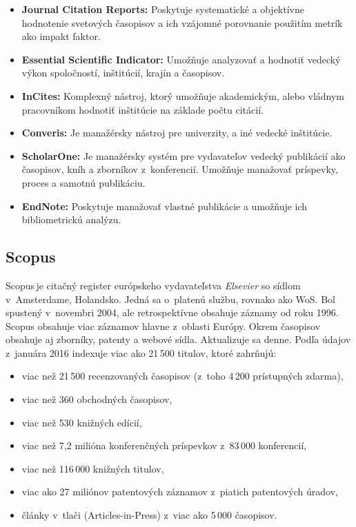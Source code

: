 \begin{itemize}
\item \textbf{Journal Citation Reports:} Poskytuje systematické a objektívne
  hodnotenie svetových časopisov a ich vzájomné porovnanie použitím metrík ako
  impakt faktor.
\item \textbf{Essential Scientific Indicator:} Umožňuje analyzovať a hodnotiť
  vedecký výkon spoločností, inštitúcií, krajín a časopisov.
\item \textbf{InCites:} Komplexný nástroj, ktorý umožňuje akademickým,
  alebo vládnym pracovníkom hodnotiť inštitúcie na základe počtu citácií.
\item \textbf{Converis:} Je manažérsky nástroj pre univerzity, a iné vedecké
  inštitúcie.
\item \textbf{ScholarOne:} Je manažérsky systém pre vydavateľov vedecký
  publikácií ako časopisov, kníh a zborníkov z~konferencií. Umožňuje
  manažovať príspevky,  proces a samotnú publikáciu.
\item \textbf{EndNote:} Poskytuje manažovať vlastné publikácie a umožňuje
  ich bibliometrickú analýzu.
\end{itemize}



\subsection{Scopus}
\label{sec:scopus}

Scopus\,\R je citačný register európskeho vydavateľstva \emph{Elsevier} so sídlom
v~Amsterdame, Holandsko.  Jedná sa o~platenú službu, rovnako ako WoS.  Bol
spustený v~novembri 2004, ale retrospektívne obsahuje záznamy od roku 1996.
Scopus obsahuje viac záznamov hlavne z~oblasti Európy.  Okrem časopisov obsahuje
aj zborníky, patenty a webové sídla.  Aktualizuje sa denne.  Podľa údajov
z~januára 2016 indexuje viac ako 21\,500 titulov, ktoré zahrňujú:

\begin{itemize}
  \item viac než 21\,500 recenzovaných časopisov (z~toho 4\,200 prístupných
    zdarma),
  \item viac než 360 obchodných časopisov,
  \item viac než 530 knižných edícií,
  \item viac než 7,2 milióna konferenčných príspevkov z~83\,000 konferencií,
  \item viac než 116\,000 knižných titulov,
  \item viac ako 27 miliónov patentových záznamov z~piatich patentových úradov,
  \item články v~tlači (Articles-in-Press) z~viac ako 5\,000 časopisov.
\end{itemize}

